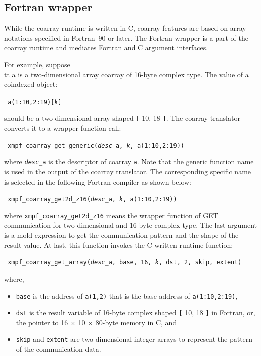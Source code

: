 \subsection{Fortran wrapper}

While the coarray runtime is written in C, coarray features are 
based on array notations specified in Fortran~90 or later.
The Fortran wrapper is a part of the coarray runtime and mediates
Fortran and C argument interfaces.

For example, suppose {\\tt a} is a two-dimensional array coarray of 
16-byte complex type. The value of a coindexed object:
\begin{center}\tt
a(1:10,2:19)[{\it k}]
\end{center}
should be a two-dimensional array shaped {\tt [} 10, 18 {\tt ]}. 
The coarray translator converts it to a wrapper function call:
\begin{center}\tt
xmpf\_coarray\_get\_generic({\it desc\_}a, {\it k}, a(1:10,2:19))
\end{center}
where {\tt{\it desc\_}a} is the descriptor of coarray {\tt a}.
Note that the generic function name is used in the output of the coarray
translator. The corresponding specific name is selected in the 
following Fortran compiler as shown below:
\begin{center}\tt
xmpf\_coarray\_get2d\_z16({\it desc\_}a, {\it k}, a(1:10,2:19))
\end{center}
where {\tt xmpf\_coarray\_get2d\_z16} means the wrapper function
of GET communication for two-dimensional and 16-byte complex type.
The last argument is a mold expression to get the communication pattern 
and the shape of the result value.
At last, this function invokes the C-written runtime function:
\begin{center}\tt
xmpf\_coarray\_get\_array({\it desc\_}a,\,base,\,16,\,{\it k},\,dst,\,2,\,skip,\,extent)
\end{center}
where, 
\begin{itemize}
\item
{\tt base} is the address of {\tt a(1,2)} that is the base address of 
{\tt a(1:10,2:19)},
\item
{\tt dst} is the result variable of 16-byte complex shaped {\tt [} 10, 18 {\tt ]}
in Fortran, or, the pointer to 16 $\times$ 10 $\times$ 80-byte memory in C, and
\item
{\tt skip} and {\tt extent} are two-dimensional integer arrays to represent 
the pattern of the communication data.
\end{itemize}

